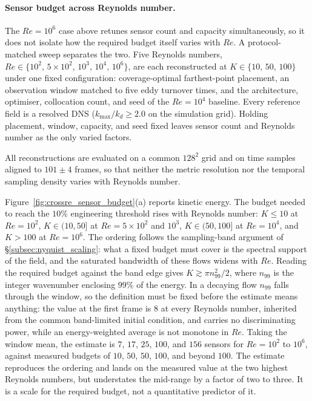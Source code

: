 \paragraph{Sensor budget across Reynolds number.}
The $Re=10^{6}$ case above retunes sensor count and capacity simultaneously, so it does not isolate how the required budget itself varies with $Re$. A protocol-matched sweep separates the two. Five Reynolds numbers, $Re \in \{10^{2},\,5\times10^{2},\,10^{3},\,10^{4},\,10^{6}\}$, are each reconstructed at $K \in \{10,\,50,\,100\}$ under one fixed configuration: coverage-optimal farthest-point placement, an observation window matched to five eddy turnover times, and the architecture, optimiser, collocation count, and seed of the $Re=10^{4}$ baseline. Every reference field is a resolved DNS ($k_{\max}/k_d \ge 2.0$ on the simulation grid). Holding placement, window, capacity, and seed fixed leaves sensor count and Reynolds number as the only varied factors.

All reconstructions are evaluated on a common $128^{2}$ grid and on time samples aligned to $101 \pm 4$ frames, so that neither the metric resolution nor the temporal sampling density varies with Reynolds number.

Figure~\ref{fig:crossre_sensor_budget}(a) reports kinetic energy. The budget needed to reach the $10\%$ engineering threshold rises with Reynolds number: $K \le 10$ at $Re=10^{2}$, $K \in (10, 50]$ at $Re=5\times10^{2}$ and $10^{3}$, $K \in (50, 100]$ at $Re=10^{4}$, and $K > 100$ at $Re=10^{6}$. The ordering follows the sampling-band argument of \S\ref{subsec:nyquist_scaling}: what a fixed budget must cover is the spectral support of the field, and the saturated bandwidth of these flows widens with $Re$. Reading the required budget against the band edge gives $K \gtrsim \pi n_{99}^{2}/2$, where $n_{99}$ is the integer wavenumber enclosing $99\%$ of the energy. In a decaying flow $n_{99}$ falls through the window, so the definition must be fixed before the estimate means anything: the value at the first frame is $8$ at every Reynolds number, inherited from the common band-limited initial condition, and carries no discriminating power, while an energy-weighted average is not monotone in $Re$. Taking the window mean, the estimate is $7$, $17$, $25$, $100$, and $156$ sensors for $Re = 10^{2}$ to $10^{6}$, against measured budgets of $10$, $50$, $50$, $100$, and beyond $100$. The estimate reproduces the ordering and lands on the measured value at the two highest Reynolds numbers, but understates the mid-range by a factor of two to three. It is a scale for the required budget, not a quantitative predictor of it.

